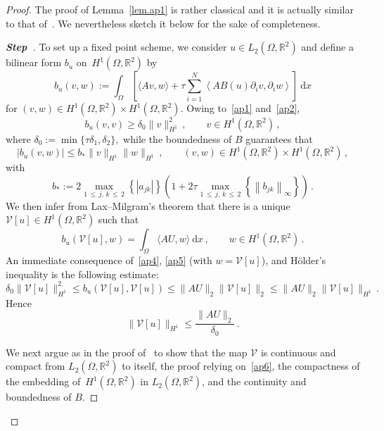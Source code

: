 \documentclass[10pt]{amsart}
\theoremstyle{definition}\newtheorem{defi}[theo]{Definition}\newtheorem{rema}[theo]{Remark}\newtheorem{exam}[theo]{Example}\newtheorem{exem}[theo]{Example}\newtheorem{nota}[theo]{Notation}
\newcommand{\bbR}{\mathbb{R}}
\newcommand{\rmd}{\mathrm{d}}
\newcommand{\clV}{\mathcal{V}}
\newcounter{stepcount}
\newenvironment{step}{\refstepcounter{stepcount}\begin{proof}[\textbf{Step~\thestepcount}]}{\let\qed\relax\end{proof}}
\begin{document}
\begin{proof}
The proof of Lemma~\ref{lem.ap1} is rather classical and it is actually similar to that of~\cite[Lemma~B.1]{LM22}. We nevertheless sketch it below for the sake of completeness.

\begin{step}
To set up a fixed point scheme, we consider $u\in L_2(\Omega,\bbR^2)$ and define a bilinear form $b_u$ on~${H^1(\Omega,\bbR^2)}$ by
\begin{equation*}
b_u(v,w) := \int_\Omega \left[\langle Av, w \rangle + \tau \sum_{i=1}^N\left\langle AB(u) \partial_i v, \partial_i w \right\rangle \right]\ \rmd x
\end{equation*}
for $ (v,w)\in H^1(\Omega,\bbR^2)\times H^1(\Omega,\bbR^2)$. Owing to~\eqref{ap1} and~\eqref{ap2},
\begin{equation}\label{ap4}
b_u(v,v) \ge \delta_0 \|v\|_{H^1}^2\,, \qquad v\in H^1\left(\Omega,\bbR^2\right)\,, 
\end{equation}
where $\delta_0:=\min\{\tau \delta_1, \delta_2\},$ while the boundedness of $B$ guarantees that
\begin{equation*}
|b_u(v,w)| \le b_* \|v\|_{H^1} \|w\|_{H^1}\,, \qquad (v,w)\in H^1\left(\Omega,\bbR^2\right)\times H^1\left(\Omega,\bbR^2\right) \,,
\end{equation*}
with
\begin{equation*}
b_* := 2\max_{1\,\le\,j,\,k\,\le\,2}\left\{\left|a_{jk}\right|\right\} \left(1 + 2\tau \max_{1\,\le\,j,\,k\,\le\,2}\left\{\left\|b_{jk}\right\|_\infty\right\} \right)\,.
\end{equation*}
We then infer from Lax--Milgram's theorem that there is a unique $\clV[u]\in H^1(\Omega,\bbR^2)$ such that
\begin{equation}\label{ap5}
b_u(\clV[u],w) = \int_\Omega \langle AU, w \rangle\ \rmd x\,, \qquad w\in H^1\left(\Omega,\bbR^2\right)\,.
\end{equation}
An immediate consequence of~\eqref{ap4}, \eqref{ap5} (with $w=\clV[u]$), and H\"older's inequality is the following estimate:
\begin{equation*}
\delta_0 \|\clV[u]\|_{H^1}^ 2 \le b_u\left(\clV[u],\clV[u]\right) \le \|AU\|_2 \|\clV[u]\|_2 \le \|AU\|_2 \|\clV[u]\|_{H^1}\,.
\end{equation*}
Hence
\begin{equation}\label{ap6}
\|\clV[u]\|_{H^1} \le \frac{\|AU\|_2}{\delta_0}\,. 
\end{equation}

We next argue as in the proof of~\cite[Lemma~B.1]{LM22} to show that the map $\clV$ is continuous and compact from $L_2(\Omega,\bbR^2)$ to itself, the proof relying on~\eqref{ap6}, the compactness of the embedding of~$H^1(\Omega,\bbR^2)$ in $L_2(\Omega,\bbR^2)$, and the continuity and boundedness of $B$.


\end{step}
\end{proof}
\end{document}
